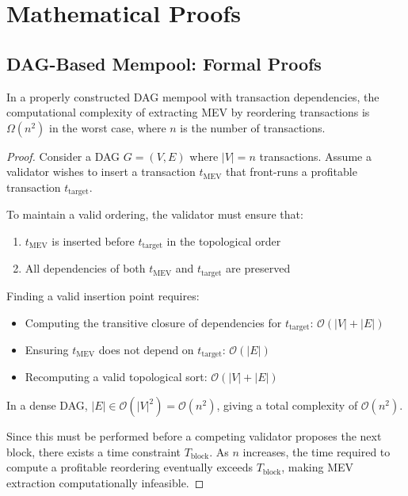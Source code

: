 \documentclass[12pt]{article}
\begin{document}
\section{Mathematical Proofs}

\subsection{DAG-Based Mempool: Formal Proofs}

\begin{theorem}
In a properly constructed DAG mempool with transaction dependencies, the computational complexity of extracting MEV by reordering transactions is $\Omega(n^2)$ in the worst case, where $n$ is the number of transactions.
\end{theorem}

\begin{proof}
Consider a DAG $G = (V, E)$ where $|V| = n$ transactions. Assume a validator wishes to insert a transaction $t_{\text{MEV}}$ that front-runs a profitable transaction $t_{\text{target}}$.

To maintain a valid ordering, the validator must ensure that:
\begin{enumerate}
\item $t_{\text{MEV}}$ is inserted before $t_{\text{target}}$ in the topological order
\item All dependencies of both $t_{\text{MEV}}$ and $t_{\text{target}}$ are preserved
\end{enumerate}

Finding a valid insertion point requires:
\begin{itemize}
\item Computing the transitive closure of dependencies for $t_{\text{target}}$: $\mathcal{O}(|V| + |E|)$
\item Ensuring $t_{\text{MEV}}$ does not depend on $t_{\text{target}}$: $\mathcal{O}(|E|)$
\item Recomputing a valid topological sort: $\mathcal{O}(|V| + |E|)$
\end{itemize}

In a dense DAG, $|E| \in \mathcal{O}(|V|^2) = \mathcal{O}(n^2)$, giving a total complexity of $\mathcal{O}(n^2)$. 

Since this must be performed before a competing validator proposes the next block, there exists a time constraint $T_{\text{block}}$. As $n$ increases, the time required to compute a profitable reordering eventually exceeds $T_{\text{block}}$, making MEV extraction computationally infeasible.
\end{proof}
\end{document}

